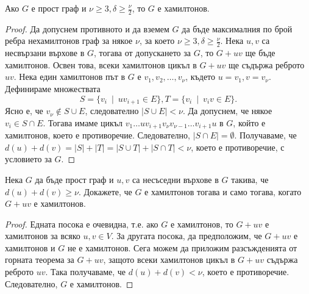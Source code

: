 \begin{thm}
  Ако $G$ е прост граф и $\nu \geq 3, \delta \geq \frac{\nu}{2}$, то $G$ е хамилтонов.
\end{thm}
\begin{proof}
  Да допуснем противното и да вземем $G$ да бъде максималния по брой ребра нехамилтонов граф за някое $\nu$, за което
  $\nu\geq 3, \delta\geq \frac{\nu}{2}$. 
  Нека $u,v$ са несвързани върхове в $G$, тогава от допускането за $G$, то $G+uv$ ще бъде хамилтонов.
  Освен това, всеки хамилтонов цикъл в $G+uv$ ще съдържа реброто $uv$. Нека един хамилтонов път в $G$ е 
  $v_1,v_2,\dots,v_{\nu}$, където $u = v_1, v = v_{\nu}$. Дефинираме множествата 
  \[S = \{v_i\ \mid\ uv_{i+1}\in E\}, T = \{v_i\ \mid\ v_iv\in E\}.\]
  Ясно е, че $v_\nu \not\in S\cup E$, следователно $|S\cup E| < \nu$.
  Да допуснем, че някое $v_i\in S\cap E$.
  Тогава имаме цикъл $v_1\dots u v_{i+1} v_{\nu} v_{\nu-1}\dots v_{i+1} u$ в $G$, който е хамилтонов, което е противоречие.
  Следователно, $|S\cap E| = \emptyset$.
  Получаваме, че $d(u) + d(v) = |S| + |T| = |S\cup T| + |S\cap T| < \nu$, което е противоречие, с условието за $G$.
\end{proof}
\begin{corollary}
  Нека $G$ да бъде прост граф и $u,v$ са несъседни върхове в $G$ такива, че $d(u) + d(v) \geq \nu$.
  Докажете, че $G$ е хамилтонов тогава и само тогава, когато $G + uv$ е хамилтонов.
\end{corollary}
\begin{proof}
  Едната посока е очевидна, т.е. ако $G$ е хамилтонов, то $G + uv$ е хамилтонов за всяко $u,v \in V$.
  За другата посока, да предположим, че $G + uv$ е хамилтонов и $G$ не е хамилтонов.
  Сега можем да приложим разсъжденията от горната теорема за $G + uv$, защото всеки хамилтонов цикъл в $G + uv$ съдържа
  реброто $uv$. Така получаваме, че $d(u) + d(v) < \nu$, което е противоречие.
  Следователно, $G$ е хамилтонов.
\end{proof}



